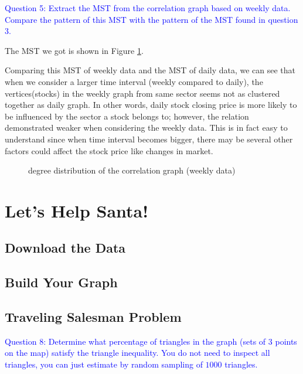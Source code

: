 \documentclass[11pt]{article}
\makeatletter
\def\maxwidth{\ifdim\Gin@nat@width>\linewidth\linewidth
    \else\Gin@nat@width\fi}
\let\Oldincludegraphics\includegraphics
\renewcommand{\includegraphics}[1]{\Oldincludegraphics[width=.8\maxwidth]{#1}}
\makeatother
\begin{document}
\textcolor{blue}{Question 5: Extract the MST from the correlation graph based on weekly data. Compare the pattern of this MST with the pattern of the MST found in question 3.
}

The MST we got is shown in Figure \ref {fig:Q5}. 

Comparing this MST of weekly data and the MST of daily data, we can see that when we consider a larger time interval (weekly compared to daily), the vertices(stocks) in the weekly graph from same sector seems not as clustered together as daily graph. In other words, daily stock closing price is more likely to be influenced by the sector a stock belongs to; however, the relation demonstrated weaker when considering the weekly data. This is in fact easy to understand since when time interval becomes bigger, there may be several other factors could affect the stock price like changes in market.


\begin{figure}[h]
\centering
{}
\caption{degree distribution of the correlation graph (weekly data)}
\label{fig:Q5}
\end{figure}









\section{Let's Help Santa!}

\subsection{Download the Data}

\subsection{Build Your Graph}

\subsection{Traveling Salesman Problem}


\textcolor{blue}{
    Question 8: Determine what percentage of triangles in the graph (sets
of 3 points on the map) satisfy the triangle inequality. You do not need
to inspect all triangles, you can just estimate by random sampling of
$1000$ triangles.
}
\end{document}
